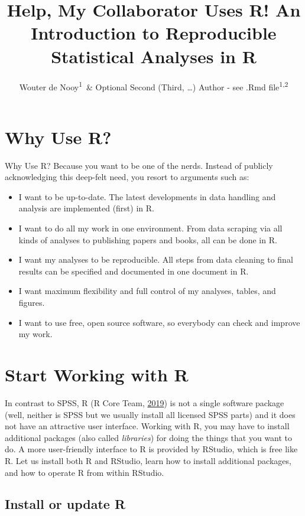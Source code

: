 \documentclass[doc,floatsintext]{apa6}
\title{Help, My Collaborator Uses R! An Introduction to Reproducible
Statistical Analyses in R}
\author{Wouter de Nooy\textsuperscript{1}~\& Optional Second (Third, \ldots{})
Author - see .Rmd file\textsuperscript{1,2}}
\date{}
\affiliation{
\vspace{0.5cm}
\textsuperscript{1} Amsterdam School of Communication Research ASCoR\\\textsuperscript{2} University of Amsterdam}
\providecommand{\tightlist}{%
  \setlength{\itemsep}{0pt}\setlength{\parskip}{0pt}}
\begin{document}
\maketitle

\section{Why Use R?}\label{why-use-r}

Why Use R? Because you want to be one of the nerds. Instead of publicly
acknowledging this deep-felt need, you resort to arguments such as:

\begin{itemize}
\tightlist
\item
  I want to be up-to-date. The latest developments in data handling and
  analysis are implemented (first) in R.
\item
  I want to do all my work in one environment. From data scraping via
  all kinds of analyses to publishing papers and books, all can be done
  in R.
\item
  I want my analyses to be reproducible. All steps from data cleaning to
  final results can be specified and documented in one document in R.
\item
  I want maximum flexibility and full control of my analyses, tables,
  and figures.
\item
  I want to use free, open source software, so everybody can check and
  improve my work.
\end{itemize}

\section{Start Working with R}\label{start-working-with-r}

In contrast to SPSS, R (R Core Team,
\protect\hyperlink{ref-R-base}{2019}) is not a single software package
(well, neither is SPSS but we usually install all licensed SPSS parts)
and it does not have an attractive user interface. Working with R, you
may have to install additional packages (also called \emph{libraries})
for doing the things that you want to do. A more user-friendly interface
to R is provided by RStudio, which is free like R. Let us install both R
and RStudio, learn how to install additional packages, and how to
operate R from within RStudio.

\subsection{Install or update R}\label{install-or-update-r}
\end{document}
